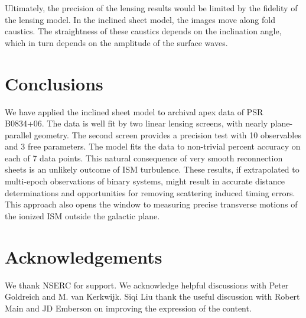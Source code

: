 \documentclass[useAMS,usenatbib]{mn2e}
\begin{document}
Ultimately, the precision of the lensing results would be limited by
the fidelity of the lensing model.  In the inclined sheet model, the
images move along fold caustics.  The straightness of these caustics
depends on the inclination angle, which in turn depends on the
amplitude of the surface waves.  

\section{Conclusions}

We have applied the \citep{2014MNRAS.442.3338P} inclined sheet model
to archival apex data of PSR B0834+06.  The data is well fit by two
linear lensing screens, with nearly plane-parallel geometry.  The
second screen provides a precision test with 10 observables and 3 free
parameters.  The model fits the data to non-trivial percent accuracy
on each of 7 data points.  This natural consequence of very smooth
reconnection sheets is an unlikely outcome of ISM turbulence.  These
results, if extrapolated to multi-epoch observations of binary
systems, might result in accurate distance determinations and
opportunities for removing scattering induced timing errors.  This
approach also opens the window to measuring precise transverse motions
of the ionized ISM outside the galactic plane.


\section{Acknowledgements}

We thank NSERC for support. We acknowledge helpful discussions with
Peter Goldreich and M. van Kerkwijk. Siqi Liu thank the useful discussion with Robert Main and JD Emberson on improving the expression of the content.


\newcommand{\araa}{ARA\&A}   %
\newcommand{\afz}{Afz}       %
\newcommand{\aj}{AJ}         %
\newcommand{\azh}{AZh}       %
\newcommand{\aaa}{A\&A}      %
\newcommand{\aas}{A\&AS}     %
\newcommand{\aar}{A\&AR}     %
\newcommand{\apj}{ApJ}       %
\newcommand{\apjs}{ApJS}     %
\newcommand{\apjl}{ApJ}      %
\newcommand{\apss}{Ap\&SS}   %
\newcommand{\baas}{BAAS}     %
\newcommand{\jaa}{JA\&A}     %
\newcommand{\mnras}{MNRAS}   %
\newcommand{\nat}{Nat}       %
\newcommand{\pasj}{PASJ}     %
\newcommand{\pasp}{PASP}     %
\newcommand{\paspc}{PASPC}   %
\newcommand{\qjras}{QJRAS}   %
\newcommand{\sci}{Sci}       %
\newcommand{\solphys}{Solar Physics}       %
\newcommand{\sova}{SvA}      %
\newcommand{\aap}{A\&A}
\newcommand\jcap{{J. Cosmology Astropart. Phys.}}%
\newcommand{\prd}{Phys. Rev. D}






\label{lastpage}
\end{document}
